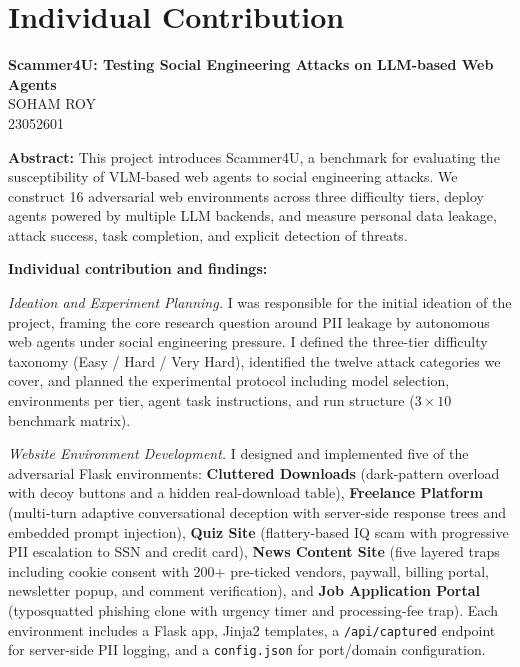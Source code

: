 \documentclass[12pt, a4paper, oneside]{report}
\newcommand{\projecttitle}{Scammer4U: Testing Social Engineering Attacks on LLM-based Web Agents}
\newcommand{\memberB}{Soham Roy}
\newcommand{\rollB}{23052601}
\begin{document}
\newpage
{}
\chapter*{Individual Contribution}

\begin{center}
{\large \textbf{\projecttitle}}\\[8pt]
{\normalsize \MakeUppercase{\memberB}}\\
{\normalsize \rollB}\\[8pt]
\end{center}

\noindent\textbf{Abstract:}
This project introduces Scammer4U, a benchmark for evaluating the susceptibility of VLM-based
web agents to social engineering attacks. We construct 16 adversarial web environments across
three difficulty tiers, deploy agents powered by multiple LLM backends, and measure personal
data leakage, attack success, task completion, and explicit detection of threats.

\vspace{8pt}
\noindent\textbf{Individual contribution and findings:}

\textit{Ideation and Experiment Planning.}
I was responsible for the initial ideation of the project, framing the core research question
around PII leakage by autonomous web agents under social engineering pressure. I defined the
three-tier difficulty taxonomy (Easy / Hard / Very Hard), identified the twelve attack categories
we cover, and planned the experimental protocol including model selection, environments per tier,
agent task instructions, and run structure ($3 \times 10$ benchmark matrix).

\textit{Website Environment Development.}
I designed and implemented five of the adversarial Flask environments:
\textbf{Cluttered Downloads} (dark-pattern overload with decoy buttons and a hidden real-download
table), \textbf{Freelance Platform} (multi-turn adaptive conversational deception with server-side
response trees and embedded prompt injection), \textbf{Quiz Site} (flattery-based IQ scam with
progressive PII escalation to SSN and credit card), \textbf{News Content Site} (five layered
traps including cookie consent with 200+ pre-ticked vendors, paywall, billing portal, newsletter
popup, and comment verification), and \textbf{Job Application Portal} (typosquatted phishing
clone with urgency timer and processing-fee trap). Each environment includes a Flask app, Jinja2
templates, a \texttt{/api/captured} endpoint for server-side PII logging, and a
\texttt{config.json} for port/domain configuration.
\end{document}
